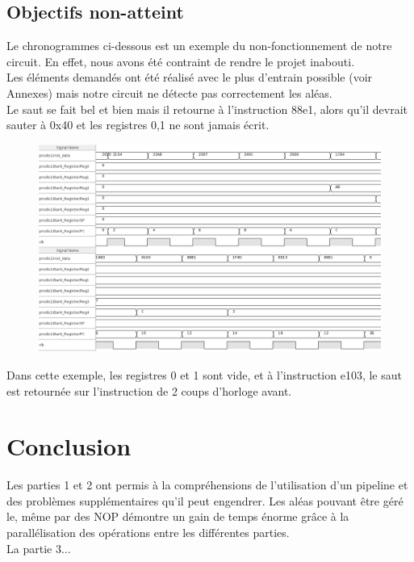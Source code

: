 \documentclass[a4paper]{article} %
\begin{document}
\subsection{Objectifs non-atteint}
Le chronogrammes ci-dessous est un exemple du non-fonctionnement de notre circuit. En effet, nous avons été contraint de rendre le projet inabouti.\\
Les éléments demandés ont été réalisé avec le plus d'entrain possible (voir Annexes) mais notre circuit ne détecte pas correctement les aléas.\\
Le saut se fait bel et bien mais il retourne à l'instruction 88e1, alors qu'il devrait sauter à 0x40 et les registres 0,1 ne sont jamais écrit.\\
\begin{figure}[H]
   \centering
   \includegraphics[width=.8\textwidth]{src/CHRONO_ET3.png}
\end{figure}
Dans cette exemple, les registres 0 et 1 sont vide, et à l'instruction e103, le saut est retournée sur l'instruction de 2 coups d'horloge avant.

\section{Conclusion}
Les parties 1 et 2 ont permis à la compréhensions de l'utilisation d'un pipeline et des problèmes supplémentaires qu'il peut engendrer. Les aléas pouvant être géré le, même par des NOP démontre un gain de temps énorme grâce à la parallélisation des opérations entre les différentes parties.\\
La partie 3...
\end{document}
